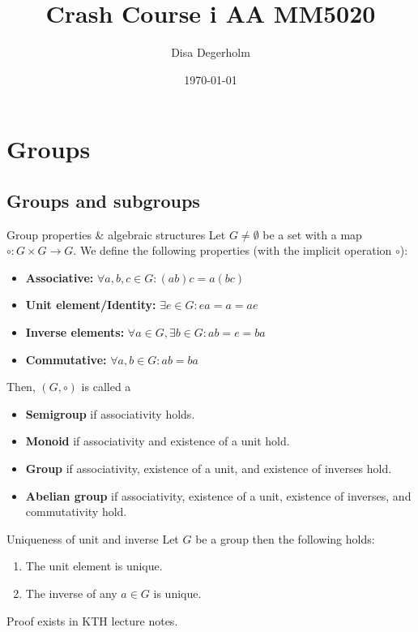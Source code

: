 \documentclass[a4paper]{article}
\title{Crash Course i AA MM5020}
\author{Disa Degerholm}
\date{\today}
\begin{document}
\makemytitlepage

\section{Groups}
\subsection{Groups and subgroups}
\begin{defi}{Group properties \& algebraic structures}
Let $G \neq \emptyset$ be a set with a map $\circ : G \times G \to G$. We define the following properties (with the implicit operation $\circ$):
\begin{itemize}
    \item \textbf{Associative:} $\forall a,b,c \in G : (ab)c = a(bc)$ 
    \item \textbf{Unit element/Identity:} $\exists e \in G : ea = a = ae$ 
    \item \textbf{Inverse elements:} $\forall a \in G, \exists b \in G : ab = e = ba$ 
    \item \textbf{Commutative:} $\forall a,b \in G : ab = ba$ 
\end{itemize}
Then, $(G, \circ)$ is called a 
\begin{itemize}
    \item \textbf{Semigroup} if associativity holds.
    \item \textbf{Monoid} if associativity and existence of a unit hold.
    \item \textbf{Group} if associativity, existence of a unit, and existence of inverses hold.
    \item \textbf{Abelian group} if associativity, existence of a unit, existence of inverses, and commutativity hold.
\end{itemize}
\end{defi}

\begin{ther}{Uniqueness of unit and inverse}
Let $G$ be a group then the following holds:
\begin{enumerate}[label=(\alph*)]
    \item The unit element is unique.
    \item The inverse of any $a \in G$ is unique.
\end{enumerate}
\end{ther}
\begin{add}
    Proof exists in KTH lecture notes.
\end{add}
\end{document}
